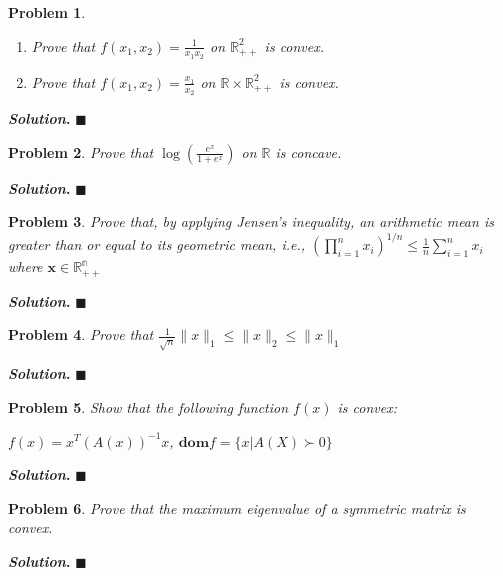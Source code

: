 \documentclass[12pt]{article}
\newtheorem{problem}{Problem}
\newenvironment{solution}[1][\textit{Solution}]{\textbf{#1. }}{$\blacksquare$}
\begin{document}
  \begin{problem}
    \begin{enumerate}
      \item Prove that $f(x_1, x_2) = \frac{1}{x_{1}x_{2}}$ on $\mathbb{R}^{2}_{++}$ is convex. 
      \item Prove that $f(x_1, x_2) = \frac{x_1}{x_{2}}$  on $\mathbb{R} \times \mathbb{R}^{2}_{++}$ is convex. 
    \end{enumerate}
  \end{problem}
  \begin{solution}
  \end{solution}

  \begin{problem}
    Prove that $\log(\frac{e^x}{1 + e^x})$ on $\mathbb{R}$ is concave.
  \end{problem}
  \begin{solution}
  \end{solution}

  \begin{problem}
    Prove that, by applying Jensen’s inequality, an arithmetic mean is greater than or equal to its geometric mean, i.e., $(\prod_{i=1}^{n} x_{i})^{1/n} \leq \frac{1}{n}\sum_{i=1}^{n} x_{i}$ where $\textbf{x} \in \mathbb{R^{n}_{++}}$
  \end{problem}
  \begin{solution}
  \end{solution}
  
  \begin{problem}
    Prove that $\frac{1}{\sqrt{n}}\lVert x \rVert_{1} \leq \lVert x \rVert_{2} \leq \lVert x \rVert_{1}$
  \end{problem}
  \begin{solution}
  \end{solution}

  \begin{problem}
    Show that the following function $f(x)$ is convex:\\
    \begin{center}
      $f(x) = x^{T}(A(x))^{-1}x$, $\textbf{dom}{f} = \{x | A(X) \succ 0\}$
    \end{center}
  \end{problem}
  \begin{solution}
  \end{solution}

  \begin{problem}
    Prove that the maximum eigenvalue of a symmetric matrix is convex.
  \end{problem}
  \begin{solution}
  \end{solution}
\end{document}
